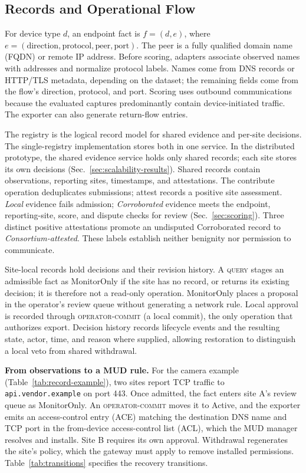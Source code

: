 \documentclass[journal]{IEEEtran}
\theoremstyle{definition}
\begin{document}
\subsection{Records and Operational Flow}
\label{subsec:endpoint-facts}
For device type $d$, an endpoint fact is $f=(d,e)$, where $e=(\text{direction},\text{protocol},\text{peer},\text{port})$. The peer is a fully qualified domain name (FQDN) or remote IP address. Before scoring, adapters associate observed names with addresses and normalize protocol labels. Names come from DNS records or HTTP/TLS metadata, depending on the dataset; the remaining fields come from the flow's direction, protocol, and port. Scoring uses outbound communications because the evaluated captures predominantly contain device-initiated traffic. The exporter can also generate return-flow entries.

The registry is the logical record model for shared evidence and per-site decisions. The single-registry implementation stores both in one service. In the distributed prototype, the shared evidence service holds only shared records; each site stores its own decisions (Sec.~\ref{sec:scalability-results}). Shared records contain observations, reporting sites, timestamps, and attestations. The contribute operation deduplicates submissions; attest records a positive site assessment. \emph{Local} evidence fails admission; \emph{Corroborated} evidence meets the endpoint, reporting-site, score, and dispute checks for review (Sec.~\ref{sec:scoring}). Three distinct positive attestations promote an undisputed Corroborated record to \emph{Consortium-attested}. These labels establish neither benignity nor permission to communicate.

Site-local records hold decisions and their revision history. A \textsc{query} stages an admissible fact as MonitorOnly if the site has no record, or returns its existing decision; it is therefore not a read-only operation. MonitorOnly places a proposal in the operator's review queue without generating a network rule. Local approval is recorded through \textsc{operator-commit} (a local commit), the only operation that authorizes export. Decision history records lifecycle events and the resulting state, actor, time, and reason where supplied, allowing restoration to distinguish a local veto from shared withdrawal.

\textbf{From observations to a MUD rule.} For the camera example (Table~\ref{tab:record-example}), two sites report TCP traffic to \texttt{api.vendor.example} on port 443. Once admitted, the fact enters site A's review queue as MonitorOnly. An \textsc{operator-commit} moves it to Active, and the exporter emits an access-control entry (ACE) matching the destination DNS name and TCP port in the from-device access-control list (ACL), which the MUD manager resolves and installs. Site B requires its own approval. Withdrawal regenerates the site's policy, which the gateway must apply to remove installed permissions. Table~\ref{tab:transitions} specifies the recovery transitions.
\end{document}
